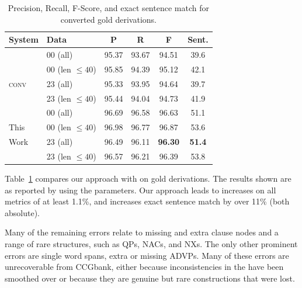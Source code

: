 \begin{table}
\centering
\begin{tabular}{llcccc}
	\hline
		System & Data & P & R & F & Sent. \\
	\hline
	\hline
		 & 00 (all) & 95.37 & 93.67 & 94.51 & 39.6 \\
		\candc & 00 (len $\le 40$) & 95.85 & 94.39 & 95.12 & 42.1 \\
		\textsc{conv} & 23 (all) & 95.33 & 93.95 & 94.64 & 39.7 \\
		 & 23 (len $\le 40$) & 95.44 & 94.04 & 94.73 & 41.9 \\
	\hline
		 & 00 (all) & 96.69 & 96.58 & 96.63 & 51.1 \\
		This & 00 (len $\le 40$) & 96.98 & 96.77 & 96.87 & 53.6 \\
		Work & 23 (all) & 96.49 & 96.11 & \textbf{96.30} & \textbf{51.4} \\
		 & 23 (len $\le 40$) & 96.57 & 96.21 & 96.39 & 53.8 \\
	\hline
\end{tabular}
\caption{\label{tab:conversion-comparison}
	\parseval Precision, Recall, F-Score, and exact sentence match for converted
	gold \ccg derivations.
}
\end{table}

Table~\ref{tab:conversion-comparison} compares our approach
with \old on gold \ccg derivations.  The results shown are 
as reported by \evalb
\parencite{Black-etal:1991} using the \textcite{Collins:1997} parameters.
Our approach leads to increases on all metrics of at least 1.1\%, and
increases exact sentence match by over 11\% (both absolute).

Many of the remaining errors relate to missing and extra clause nodes and a
range of rare structures, such as QPs, NACs, and NXs. The only other prominent
errors are single word spans, \myeg extra or missing ADVPs.  Many of these errors
are unrecoverable from CCGbank, either because inconsistencies in the \ptb have
been smoothed over or because they are genuine but rare constructions that
were lost.


